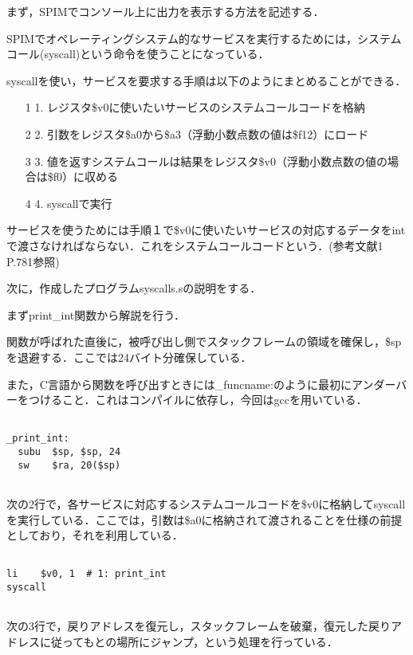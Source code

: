 \documentclass[a4j]{jarticle}
\begin{document}
まず，SPIMでコンソール上に出力を表示する方法を記述する．

SPIMでオペレーティングシステム的なサービスを実行するためには，システムコール(syscall)という命令を使うことになっている．

syscallを使い，サービスを要求する手順は以下のようにまとめることができる．

\begin{itemize}
\item[1]1. レジスタ\$v0に使いたいサービスのシステムコールコードを格納
\item[2]2. 引数をレジスタ\$a0から\$a3（浮動小数点数の値は\$f12）にロード
\item[3]3. 値を返すシステムコールは結果をレジスタ\$v0（浮動小数点数の値の場合は\$f0）に収める
\item[4]4. syscallで実行
\end{itemize}

サービスを使うためには手順１で\$v0に使いたいサービスの対応するデータをintで渡さなければならない．これをシステムコールコードという．(参考文献1 P.781参照)


次に，作成したプログラムsyscalls.sの説明をする．

まずprint\_int関数から解説を行う．


関数が呼ばれた直後に，被呼び出し側でスタックフレームの領域を確保し，\$spを退避する．ここでは24バイト分確保している．

また，C言語から関数を呼び出すときには\_funcname:のように最初にアンダーバーをつけること．これはコンパイルに依存し，今回はgccを用いている．　

{\baselineskip 3mm
\begin{verbatim}

_print_int:
  subu  $sp, $sp, 24
  sw    $ra, 20($sp)
 
\end{verbatim}
}

次の2行で，各サービスに対応するシステムコールコードを\$v0に格納してsyscallを実行している．ここでは，引数は\$a0に格納されて渡されることを仕様の前提としており，それを利用している．

{\baselineskip 3mm
\begin{verbatim}

li    $v0, 1  # 1: print_int
syscall
 
\end{verbatim}
}

次の3行で，戻りアドレスを復元し，スタックフレームを破棄，復元した戻りアドレスに従ってもとの場所にジャンプ，という処理を行っている．
\end{document}
